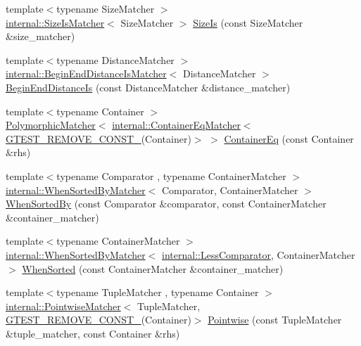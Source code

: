 \begin{DoxyCompactItemize}
\item 
{\footnotesize template$<$typename Size\+Matcher $>$ }\\\hyperlink{classtesting_1_1internal_1_1_size_is_matcher}{internal\+::\+Size\+Is\+Matcher}$<$ Size\+Matcher $>$ \hyperlink{namespacetesting_acd5e215558f95f1393c048a6d496060d}{Size\+Is} (const Size\+Matcher \&size\+\_\+matcher)
\item 
{\footnotesize template$<$typename Distance\+Matcher $>$ }\\\hyperlink{classtesting_1_1internal_1_1_begin_end_distance_is_matcher}{internal\+::\+Begin\+End\+Distance\+Is\+Matcher}$<$ Distance\+Matcher $>$ \hyperlink{namespacetesting_a122739b5b6bd9f993f26800dafdb4cc3}{Begin\+End\+Distance\+Is} (const Distance\+Matcher \&distance\+\_\+matcher)
\item 
{\footnotesize template$<$typename Container $>$ }\\\hyperlink{classtesting_1_1_polymorphic_matcher}{Polymorphic\+Matcher}$<$ \hyperlink{classtesting_1_1internal_1_1_container_eq_matcher}{internal\+::\+Container\+Eq\+Matcher}$<$ \hyperlink{gtest-internal_8h_a2ffec8c60510eb130af387f5ce9a756a}{G\+T\+E\+S\+T\+\_\+\+R\+E\+M\+O\+V\+E\+\_\+\+C\+O\+N\+S\+T\+\_\+}(Container)$>$ $>$ \hyperlink{namespacetesting_a5928ffc4e976a4da981512c422792840}{Container\+Eq} (const Container \&rhs)
\item 
{\footnotesize template$<$typename Comparator , typename Container\+Matcher $>$ }\\\hyperlink{classtesting_1_1internal_1_1_when_sorted_by_matcher}{internal\+::\+When\+Sorted\+By\+Matcher}$<$ Comparator, Container\+Matcher $>$ \hyperlink{namespacetesting_af74dfcde9ed88d79cf69dfda049078a3}{When\+Sorted\+By} (const Comparator \&comparator, const Container\+Matcher \&container\+\_\+matcher)
\item 
{\footnotesize template$<$typename Container\+Matcher $>$ }\\\hyperlink{classtesting_1_1internal_1_1_when_sorted_by_matcher}{internal\+::\+When\+Sorted\+By\+Matcher}$<$ \hyperlink{structtesting_1_1internal_1_1_less_comparator}{internal\+::\+Less\+Comparator}, Container\+Matcher $>$ \hyperlink{namespacetesting_a01468e3e641c72a2efb605b4c34675ee}{When\+Sorted} (const Container\+Matcher \&container\+\_\+matcher)
\item 
{\footnotesize template$<$typename Tuple\+Matcher , typename Container $>$ }\\\hyperlink{classtesting_1_1internal_1_1_pointwise_matcher}{internal\+::\+Pointwise\+Matcher}$<$ Tuple\+Matcher, \hyperlink{gtest-internal_8h_a2ffec8c60510eb130af387f5ce9a756a}{G\+T\+E\+S\+T\+\_\+\+R\+E\+M\+O\+V\+E\+\_\+\+C\+O\+N\+S\+T\+\_\+}(Container)$>$ \hyperlink{namespacetesting_a51ee81f6f1723f7a7aff0429b1d76ec1}{Pointwise} (const Tuple\+Matcher \&tuple\+\_\+matcher, const Container \&rhs)

\end{DoxyCompactItemize}
